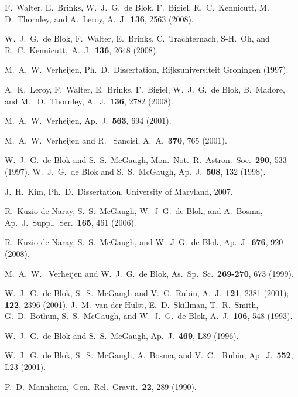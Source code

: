 \begin{thebibliography}{10}
 F.~Walter, E.~Brinks, W.~J.~G.~de Blok, F.~Bigiel, R.~C.~Kennicutt, M.~ D.~Thornley, and A.~Leroy, A.~J.~{\bf 136},  2563 (2008).

 W.~J.~G.~de Blok, F.~Walter, E.~Brinks, C.~Trachternach, S-H.~Oh, and R.~C.~Kennicutt,~A.~J.~{\bf 136}, 2648 (2008).

 M.~A.~W.~Verheijen, Ph.~D.~Dissertation, Rijksuniversiteit Groningen (1997).

 A.~K.~Leroy, F.~Walter, E.~Brinks,  F.~Bigiel, W.~J.~G.~de Blok, B.~Madore, and M.~ D.~Thornley, A.~J.~{\bf 136},  2782 (2008).

 M.~A.~W.~Verheijen, Ap.~J.~{\bf 563}, 694 (2001).

 M.~A.~W.~Verheijen and R.~ Sancisi, A.~A.~{\bf  370}, 765 (2001).

 W.~J.~G.~de Blok and S.~S.~McGaugh, Mon.~Not.~R.~Astron.~Soc.~{\bf 290}, 533 (1997).
 W.~J.~G.~de Blok and S.~S.~McGaugh, Ap.~J.~{\bf 508}, 132 (1998).



 J.~H.~Kim, Ph.~D.~Dissertation, University of Maryland, 2007. 


 R.~Kuzio de Naray, S.~S.~McGaugh, W.~J~G.~de Blok, and A.~Bosma,  Ap.~J.~Suppl.~Ser.~{\bf 165}, 461 (2006).



 R.~Kuzio de Naray, S.~S.~McGaugh, and W.~J~G.~de Blok, Ap.~J.~{\bf  676}, 920 (2008).

 M.~A.~W.~ Verheijen and  W.~J.~G.~de Blok, As.~Sp.~Sc.~{\bf 269-270}, 673 (1999).

 W.~J.~G.~de Blok, S.~S.~McGaugh and V.~C.~Rubin, A.~J.~{\bf 121}, 2381 (2001); {\bf 122}, 2396 (2001).
 J.~M.~van der Hulst, E.~D.~Skillman, T.~R.~Smith, G.~D.~Bothun, S.~S.~McGaugh, and W.~J.~G.~de Blok, A.~J.~{\bf 106}, 548 (1993).

 W.~J.~G.~de Blok and S.~S.~McGaugh, Ap.~J.~{\bf 469}, L89 (1996).



 W.~J.~G.~de Blok, S.~S.~McGaugh, A.~Bosma, and V.~C.~ Rubin, Ap.~J.~{\bf 552}, L23 (2001).


 P.~D.~Mannheim,~Gen.~Rel.~Gravit.~{\bf 22}, 289 (1990).



\end{thebibliography}
